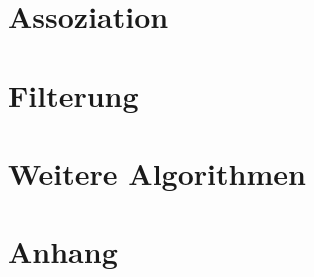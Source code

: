 \part{Assoziation}


\part{Filterung}


\part{Weitere Algorithmen}





\part{Anhang}
\appendix







\printglossaries


